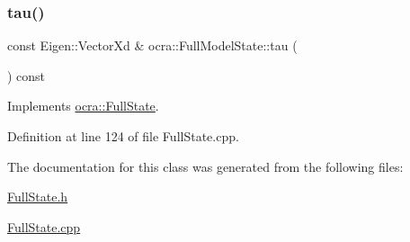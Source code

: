 \hypertarget{classocra_1_1FullModelState_aa774cf6a9a50ed4b50c037ae981d2c7b}{}\label{classocra_1_1FullModelState_aa774cf6a9a50ed4b50c037ae981d2c7b} 
\subsubsection{\texorpdfstring{tau()}{tau()}}
{\footnotesize\ttfamily const Eigen\+::\+Vector\+Xd \& ocra\+::\+Full\+Model\+State\+::tau (\begin{DoxyParamCaption}{ }\end{DoxyParamCaption}) const\hspace{0.3cm}{\ttfamily [virtual]}}



Implements \hyperlink{classocra_1_1FullState_a24723b4a382c2bf51e6c32cbd1bd7b06}{ocra\+::\+Full\+State}.



Definition at line 124 of file Full\+State.\+cpp.



The documentation for this class was generated from the following files\+:\begin{DoxyCompactItemize}
\item 
\hyperlink{FullState_8h}{Full\+State.\+h}\item 
\hyperlink{FullState_8cpp}{Full\+State.\+cpp}\end{DoxyCompactItemize}
